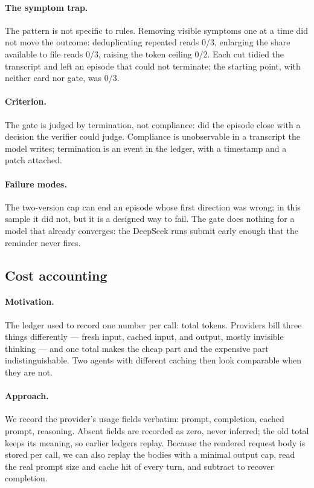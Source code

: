 \paragraph{The symptom trap.} The pattern is not specific to rules. Removing
visible symptoms one at a time did not move the outcome: deduplicating repeated
reads 0/3, enlarging the share available to file reads 0/3,
raising the token ceiling 0/2. Each cut tidied the transcript and left
an episode that could not terminate; the starting point, with neither card nor
gate, was 0/3.

\paragraph{Criterion.} The gate is judged by termination, not compliance: did
the episode close with a decision the verifier could judge. Compliance is
unobservable in a transcript the model writes; termination is an event in the
ledger, with a timestamp and a patch attached.

\paragraph{Failure modes.} The two-version cap can end an episode whose first
direction was wrong; in this sample it did not, but it is a designed way to
fail. The gate does nothing for a model that already converges: the DeepSeek
runs submit early enough that the reminder never fires.

\subsection{Cost accounting}

\paragraph{Motivation.} The ledger used to record one number per call: total
tokens. Providers bill three things differently --- fresh input, cached input,
and output, mostly invisible thinking --- and one total makes the cheap part
and the expensive part indistinguishable. Two agents with different caching
then look comparable when they are not.

\paragraph{Approach.} We record the provider's usage fields verbatim: prompt,
completion, cached prompt, reasoning. Absent fields are recorded as zero, never
inferred; the old total keeps its meaning, so earlier ledgers replay. Because
the rendered request body is stored per call, we can also replay the bodies with
a minimal output cap, read the real prompt size and cache hit of every turn, and
subtract to recover completion.

